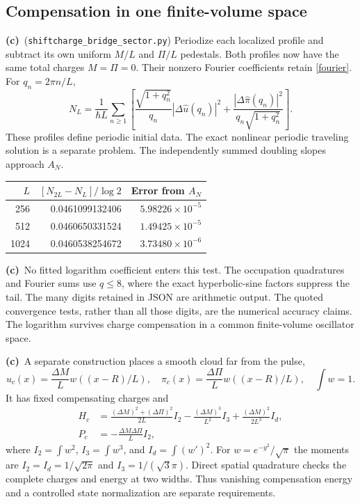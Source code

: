 \documentclass[11pt,a4paper]{article}
\newcommand{\C}{\textbf{(c)}\ }
\newcommand{\file}[1]{\nolinkurl{#1}}
\newcommand{\scs}{\file{shiftcharge_bridge_sector.py}}
\begin{document}
\subsection{Compensation in one finite-volume space}
\C (\scs) Periodize each localized profile and subtract its own
uniform $M/L$ and $\Pi/L$ pedestals. Both profiles now have the same
total charges $M=\Pi=0$. Their nonzero Fourier coefficients retain
\eqref{fourier}. For $q_n=2\pi n/L$,
\begin{equation}
 N_L=\frac1{\hbar L}\sum_{n\geq1}
 \left[
 \frac{\sqrt{1+q_n^2}}{q_n}|\Delta\widehat u(q_n)|^2+
 \frac{|\Delta\widehat\pi(q_n)|^2}{q_n\sqrt{1+q_n^2}}
 \right].
 \label{finite-overlap}
\end{equation}
These profiles define periodic initial data.
The exact nonlinear periodic traveling solution is a separate problem.
The independently summed doubling slopes approach $A_N$.

\begin{center}
\begin{tabular}{@{}rrr@{}}
\toprule
$L$ & $[N_{2L}-N_L]/\log2$ & Error from $A_N$\\
\midrule
256 & 0.0461099132406 & $5.98226\times10^{-5}$\\
512 & 0.0460650331524 & $1.49425\times10^{-5}$\\
1024 & 0.0460538254672 & $3.73480\times10^{-6}$\\
\bottomrule
\end{tabular}
\end{center}
\C No fitted logarithm coefficient enters this test. The occupation
quadratures and Fourier sums use $q\leq8$, where the exact hyperbolic-sine
factors suppress the tail. The many digits retained in JSON are arithmetic
output. The quoted convergence tests, rather than all those digits, are
the numerical accuracy claims. The logarithm survives charge compensation
in a common finite-volume oscillator space.

\C A separate construction places a smooth cloud far from the pulse,
\begin{equation}
 u_c(x)=\frac{\Delta M}{L}w((x-R)/L),\quad
 \pi_c(x)=\frac{\Delta\Pi}{L}w((x-R)/L),\quad
 \int w=1 .
\end{equation}
It has fixed compensating charges and
\begin{align}
 H_c&=\frac{(\Delta M)^2+(\Delta\Pi)^2}{2L}I_2
 -\frac{(\Delta M)^3}{L^2}I_3
 +\frac{(\Delta M)^2}{2L^3}I_d,\nonumber\\
 P_c&=-\frac{\Delta M\Delta\Pi}{L}I_2 ,
 \label{cloud}
\end{align}
where $I_2=\int w^2$, $I_3=\int w^3$, and $I_d=\int(w')^2$.
For $w=e^{-y^2}/\sqrt\pi$ the moments are
$I_2=I_d=1/\sqrt{2\pi}$ and $I_3=1/(\sqrt3\pi)$.
Direct spatial quadrature checks the complete charges and energy at two
widths. Thus vanishing compensation energy and a controlled state
normalization are separate requirements.
\end{document}
